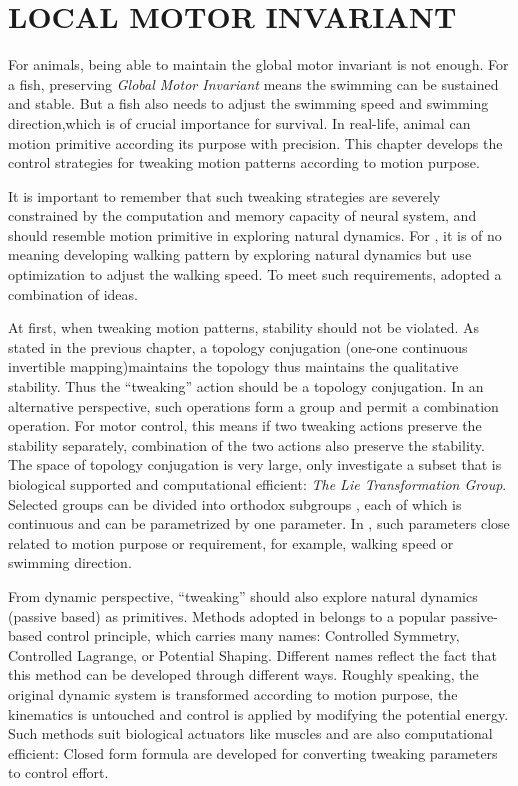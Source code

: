 \chapter{LOCAL MOTOR INVARIANT}
\label{chap:li}

\graphicspath{{LocalInvariant/LocalInvariantFigs/EPS/}{LocalInvariant/LocalInvariantFigs/}}
For animals,  being able to maintain the global motor invariant is not enough.
For a fish, preserving \emph{Global Motor Invariant}  means the swimming can be sustained and stable.
But a fish also needs to adjust the swimming speed and swimming direction,which is of crucial importance for survival.
In real-life, animal can  motion primitive according its purpose with precision.
This chapter develops the control strategies for tweaking motion patterns according to motion purpose.

It is important to remember that such tweaking strategies are severely constrained by the computation and memory capacity of neural system,  and should resemble  motion primitive in exploring natural dynamics.
For \cms, it is of no meaning developing walking pattern by exploring natural dynamics but use optimization to adjust the walking speed. To meet such requirements, \moit adopted a combination of ideas.

At first, when tweaking motion patterns, stability should not be violated. 
As stated in the previous chapter, a topology conjugation (one-one continuous invertible mapping)maintains the topology thus maintains the qualitative stability. Thus the ``tweaking'' action should be a topology conjugation. In an alternative perspective, such operations form a group and permit a combination operation. 
For motor control, this means if two tweaking actions preserve the stability separately, combination of the two actions also preserve the stability.
The space of topology conjugation is very large, \moit only investigate a subset that is biological supported and computational efficient: \emph{The Lie Transformation Group}.
Selected groups can be divided into orthodox subgroups , each of which is continuous and can be parametrized by one parameter.
In \cms, such parameters close related to motion purpose or requirement, for example, walking speed or swimming direction.

From dynamic perspective, ``tweaking''  should also explore natural dynamics (passive based) as primitives.
Methods adopted in \moit belongs to  a popular passive-based control principle, which carries many names: Controlled Symmetry, Controlled Lagrange, or Potential Shaping.
Different names reflect the fact that this method can be developed through different ways.
Roughly speaking, the original dynamic system is transformed according to motion purpose, the kinematics is untouched and control is applied by modifying the potential energy.
Such methods suit biological actuators like muscles and are also computational efficient:
Closed form formula are developed for converting tweaking parameters to control effort.

